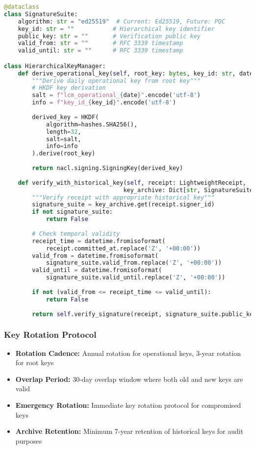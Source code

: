 \documentclass[12pt,a4paper]{article}
\begin{document}
\begin{lstlisting}[language=Python, caption=Key Hierarchy Implementation]
@dataclass 
class SignatureSuite:
    algorithm: str = "ed25519"  # Current: Ed25519, Future: PQC
    key_id: str = ""           # Hierarchical key identifier
    public_key: str = ""       # Verification public key
    valid_from: str = ""       # RFC 3339 timestamp
    valid_until: str = ""      # RFC 3339 timestamp

class HierarchicalKeyManager:
    def derive_operational_key(self, root_key: bytes, key_id: str, date: str) -> SigningKey:
        """Derive daily operational key from root key"""
        # HKDF key derivation
        salt = f"lcm_operational_{date}".encode('utf-8')
        info = f"key_id_{key_id}".encode('utf-8')
        
        derived_key = HKDF(
            algorithm=hashes.SHA256(),
            length=32,
            salt=salt,
            info=info
        ).derive(root_key)
        
        return nacl.signing.SigningKey(derived_key)
    
    def verify_with_historical_key(self, receipt: LightweightReceipt, 
                                  key_archive: Dict[str, SignatureSuite]) -> bool:
        """Verify receipt with appropriate historical key"""
        signature_suite = key_archive.get(receipt.signer_id)
        if not signature_suite:
            return False
            
        # Check temporal validity
        receipt_time = datetime.fromisoformat(
            receipt.committed_at.replace('Z', '+00:00'))
        valid_from = datetime.fromisoformat(
            signature_suite.valid_from.replace('Z', '+00:00'))
        valid_until = datetime.fromisoformat(
            signature_suite.valid_until.replace('Z', '+00:00'))
        
        if not (valid_from <= receipt_time <= valid_until):
            return False
            
        return self.verify_signature(receipt, signature_suite.public_key)
\end{lstlisting}

\subsubsection{Key Rotation Protocol}

\begin{itemize}
\item \textbf{Rotation Cadence:} Annual rotation for operational keys, 3-year rotation for root keys
\item \textbf{Overlap Period:} 30-day overlap window where both old and new keys are valid
\item \textbf{Emergency Rotation:} Immediate key rotation protocol for compromised keys
\item \textbf{Archive Retention:} Minimum 7-year retention of historical keys for audit purposes
\end{itemize}
\end{document}
